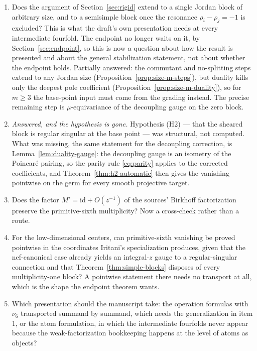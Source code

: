 \documentclass[11pt]{article}
\theoremstyle{definition}
\theoremstyle{remark}
\begin{document}
\begin{enumerate}
\item Does the argument of Section~\ref{sec:rigid} extend to a single Jordan
  block of arbitrary size, and to a semisimple block once the resonance
  $\rho_i-\rho_j=-1$ is excluded? This is what the draft's own presentation
  needs at every intermediate fourfold. The endpoint no longer waits on it, by
  Section~\ref{sec:endpoint}, so this is now a question about how the result is
  presented and about the general stabilization statement, not about whether the
  endpoint holds. Partially answered: the commutant and no-splitting steps
  extend to any Jordan size (Proposition~\ref{prop:size-m-steps}), but duality
  kills only the deepest pole coefficient
  (Proposition~\ref{prop:size-m-duality}), so for $m\ge3$ the base-point input
  must come from the grading instead. The precise remaining step is
  $\mu$-equivariance of the decoupling gauge on the zero block.
\item \emph{Answered, and the hypothesis is gone.} Hypothesis (H2) --- that the
  sheared block is regular singular at the base point --- was structural, not
  computed. What was missing, the same statement for the decoupling correction,
  is Lemma~\ref{lem:duality-gauge}: the decoupling gauge is an isometry of the
  Poincar\'e pairing, so the parity rule \eqref{eq:parity} applies to the
  corrected coefficients, and Theorem~\ref{thm:h2-automatic} then gives the
  vanishing pointwise on the germ for every smooth projective target.
\item Does the factor $M'=\mathrm{id}+O(z^{-1})$ of the sources' Birkhoff
  factorization preserve the primitive-sixth multiplicity? Now a cross-check
  rather than a route.
\item For the low-dimensional centers, can primitive-sixth vanishing be proved
  pointwise in the coordinates Iritani's specialization produces, given that the
  nef-canonical case already yields an integral-$z$ gauge to a regular-singular
  connection and that Theorem~\ref{thm:simple-blocks} disposes of every
  multiplicity-one block? A pointwise statement there needs no transport at all,
  which is the shape the endpoint theorem wants.
\item Which presentation should the manuscript take: the operation formulas
  with $\nu_6$ transported summand by summand, which needs the generalization in
  item 1, or the atom formulation, in which the intermediate fourfolds never
  appear because the weak-factorization bookkeeping happens at the level of
  atoms as objects?
\end{enumerate}
\end{document}
